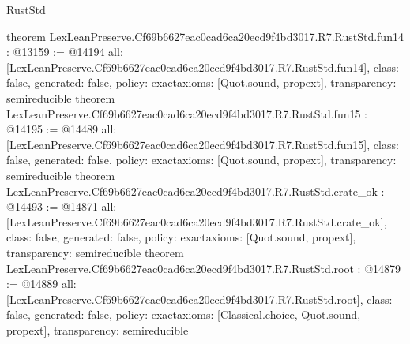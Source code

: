 \begin{lexlean}{RustStd}
\begin{coremodule}
{}
theorem LexLeanPreserve.Cf69b6627eac0cad6ca20ecd9f4bd3017.R7.RustStd.fun14 : @13159 := @14194 {
  all: [LexLeanPreserve.Cf69b6627eac0cad6ca20ecd9f4bd3017.R7.RustStd.fun14],
  class: false,
  generated: false,
  policy: exact{axioms: [Quot.sound, propext]},
  transparency: semireducible
}
theorem LexLeanPreserve.Cf69b6627eac0cad6ca20ecd9f4bd3017.R7.RustStd.fun15 : @14195 := @14489 {
  all: [LexLeanPreserve.Cf69b6627eac0cad6ca20ecd9f4bd3017.R7.RustStd.fun15],
  class: false,
  generated: false,
  policy: exact{axioms: [Quot.sound, propext]},
  transparency: semireducible
}
theorem LexLeanPreserve.Cf69b6627eac0cad6ca20ecd9f4bd3017.R7.RustStd.crate_ok : @14493 := @14871 {
  all: [LexLeanPreserve.Cf69b6627eac0cad6ca20ecd9f4bd3017.R7.RustStd.crate_ok],
  class: false,
  generated: false,
  policy: exact{axioms: [Quot.sound, propext]},
  transparency: semireducible
}
theorem LexLeanPreserve.Cf69b6627eac0cad6ca20ecd9f4bd3017.R7.RustStd.root : @14879 := @14889 {
  all: [LexLeanPreserve.Cf69b6627eac0cad6ca20ecd9f4bd3017.R7.RustStd.root],
  class: false,
  generated: false,
  policy: exact{axioms: [Classical.choice, Quot.sound, propext]},
  transparency: semireducible
}


\end{coremodule}
\end{lexlean}
